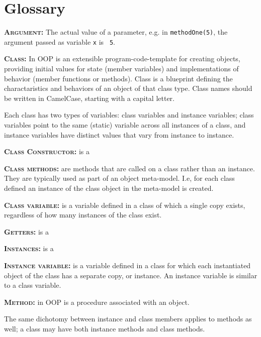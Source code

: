 \documentclass[11pt,a4paper]{article}
\begin{document}
\newpage
\section{Glossary}

\smallskip \smallskip
\noindent
\textbf{\textsc{Argument:}} The actual value of a parameter, e.g. in
{\tt methodOne(5)}, the argument passed as variable {\tt x} is {\tt
5}.

\smallskip \smallskip
\noindent \textbf{\textsc{Class:}} In OOP is an extensible
program-code-template for creating objects, providing initial values
for state (member variables) and implementations of behavior (member
functions or methods). Class is a blueprint defining the
charactaristics and behaviors of an object of that class type. Class
names should be written in CamelCase, starting with a capital letter.

\noindent
Each class has two types of variables: class variables and instance variables; class variables point to the same (static) variable across all instances of a class, and instance variables have distinct values that vary from instance to instance. 

\smallskip  \smallskip
\noindent
\textbf{\textsc{Class Constructor:}} is a 

\smallskip \smallskip
\noindent
\textbf{\textsc{Class methods:}} are methods that are called on a
class rather than an instance. They are typically used as part of an
object meta-model. I.e, for each class defined an instance of the
class object in the meta-model is created.

\smallskip \smallskip
\noindent \textbf{\textsc{Class variable:}} is a variable defined in a
class of which a single copy exists, regardless of how many instances
of the class exist.

\smallskip \smallskip
\noindent
\textbf{\textsc{Getters:}} is a 

\smallskip
\noindent
\textbf{\textsc{Instances:}} is a 

\smallskip \smallskip
\noindent \textbf{\textsc{Instance variable:}} is a variable defined
in a class for which each instantiated object of the class has a
separate copy, or instance. An instance variable is similar to a class
variable.

\smallskip \smallskip
\noindent \textbf{\textsc{Method:}} in OOP is a procedure associated
with an object.

\noindent 
The same dichotomy between instance and class members applies to
methods as well; a class may have both instance methods and class
methods.
\end{document}
